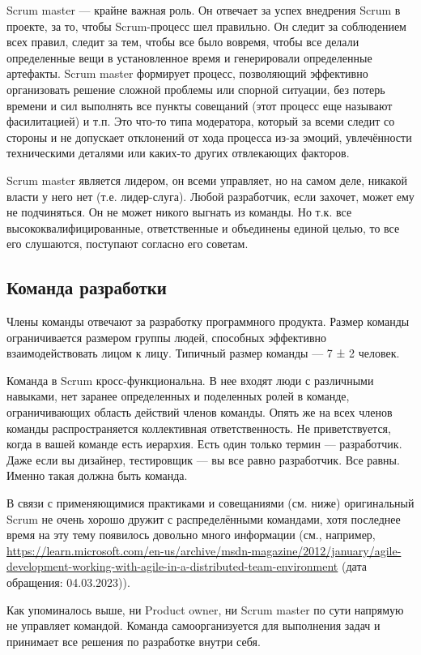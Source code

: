 \documentclass{../../text-style}
\begin{document}
Scrum master --- крайне важная роль. Он отвечает за успех внедрения Scrum в проекте, за то, чтобы Scrum-процесс шел правильно. Он следит за соблюдением всех правил, следит за тем, чтобы все было вовремя, чтобы все делали определенные вещи в установленное время и генерировали определенные артефакты. Scrum master формирует процесс, позволяющий эффективно организовать решение сложной проблемы или спорной ситуации, без потерь времени и сил выполнять все пункты совещаний (этот процесс еще называют фасилитацией) и т.п. Это что-то типа модератора, который за всеми следит со стороны и не допускает отклонений от хода процесса из-за эмоций, увлечённости техническими деталями или каких-то других отвлекающих факторов.

Scrum master является лидером, он всеми управляет, но на самом деле, никакой власти у него нет (т.е. лидер-слуга). Любой разработчик, если захочет, может ему не подчиняться. Он не может никого выгнать из команды. Но т.к. все высококвалифицированные, ответственные и объединены единой целью, то все его слушаются, поступают согласно его советам.

\subsection{Команда разработки}

Члены команды отвечают за разработку программного продукта. Размер команды ограничивается размером группы людей, способных эффективно взаимодействовать лицом к лицу. Типичный размер команды --- 7 ± 2 человек.

Команда в Scrum кросс-функциональна. В нее входят люди с различными навыками, нет заранее определенных и поделенных ролей в команде, ограничивающих область действий членов команды. Опять же на всех членов команды распространяется коллективная ответственность. Не приветствуется, когда в вашей команде есть иерархия. Есть один только термин --- разработчик. Даже если вы дизайнер, тестировщик --- вы все равно разработчик. Все равны. Именно такая должна быть команда.

В связи с применяющимися практиками и совещаниями (см. ниже) оригинальный Scrum не очень хорошо дружит с распределёнными командами, хотя последнее время на эту тему появилось довольно много информации (см., например, \url{https://learn.microsoft.com/en-us/archive/msdn-magazine/2012/january/agile-development-working-with-agile-in-a-distributed-team-environment} (дата обращения: 04.03.2023)).

Как упоминалось выше, ни Product owner, ни Scrum master по сути напрямую не управляет командой. Команда самоорганизуется для выполнения задач и принимает все решения по разработке внутри себя.
\end{document}
